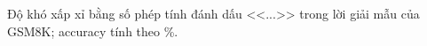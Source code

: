 Độ khó xấp xỉ bằng số phép tính đánh dấu <<...>> trong lời giải mẫu của GSM8K; accuracy tính theo \%.
